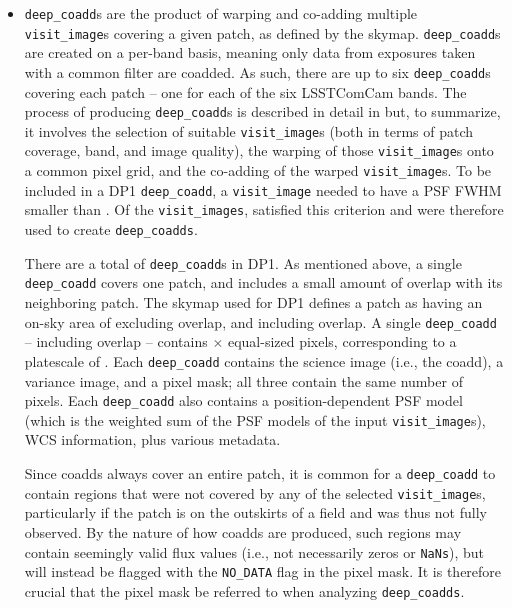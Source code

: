 \begin{itemize}
\item \texttt{deep\_coadd}s \citep{10.71929/rubin/2570313} are the product of warping and co-adding multiple \texttt{visit\_image}s covering a given \gls{patch}, as defined by the skymap.
\texttt{deep\_coadd}s are created on a per-band basis, meaning only data from exposures taken with a common filter are coadded.
As such, there are up to six \texttt{deep\_coadd}s covering each \gls{patch} -- one for each of the six \gls{LSSTComCam} bands.
The process of producing \texttt{deep\_coadd}s is described in detail in  but, to summarize, it involves the selection of suitable \texttt{visit\_image}s (both in terms of \gls{patch} coverage, band, and image quality), the warping of those \texttt{visit\_image}s onto a common pixel grid, and the co-adding of the warped \texttt{visit\_image}s.
To be included in a \gls{DP1} \texttt{deep\_coadd}, a \texttt{visit\_image} needed to have a \gls{PSF} \gls{FWHM} smaller than \deepcoaddmaxfwhm. Of the \nvisitimages \texttt{visit\_images}, \ndeepcoaddvisitimages satisfied this criterion and were therefore used to create \texttt{deep\_coadds}.

There are a total of \ndeepcoadds \texttt{deep\_coadd}s in \gls{DP1}.
As mentioned above, a single \texttt{deep\_coadd} covers one \gls{patch}, and includes a small amount of overlap with its neighboring \gls{patch}.
The skymap used for \gls{DP1} defines a \gls{patch} as having an on-sky area of \innerpatcharea excluding overlap, and \outerpatcharea including overlap. A single \texttt{deep\_coadd} -- including overlap -- contains \ndeepcoaddpixx $\times$ \ndeepcoaddpixy equal-sized pixels, corresponding to a platescale of \rawplatescale.
Each \texttt{deep\_coadd} contains the science image (i.e., the coadd), a variance image, and a pixel mask; all three contain the same number of pixels.
Each \texttt{deep\_coadd} also contains a position-dependent \gls{PSF} model (which is the weighted sum of the \gls{PSF} models of the input \texttt{visit\_image}s), \gls{WCS} information, plus various \gls{metadata}.

Since coadds always cover an entire \gls{patch}, it is common for a \texttt{deep\_coadd} to contain regions that were not covered by any of the selected \texttt{visit\_image}s, particularly if the \gls{patch} is on the outskirts of a field and was thus not fully observed. 
By the nature of how coadds are produced, such regions may contain seemingly valid \gls{flux} values (i.e., not necessarily zeros or \texttt{NaNs}), but will instead be flagged with the \texttt{NO\_DATA} flag in the pixel mask. 
It is therefore crucial that the pixel mask be referred to when analyzing \texttt{deep\_coadds}.


\end{itemize}
